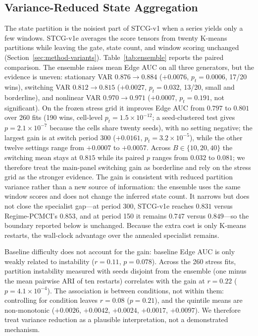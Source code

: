 \documentclass[sigconf,anonymous]{acmart}
\begin{document}
\subsection{Variance-Reduced State Aggregation}
\label{sec:exp-ensemble}

The state partition is the noisiest part of STCG-v1 when a series yields only a few windows.
STCG-v1e averages the score tensors from twenty K-means partitions while leaving the gate, state count, and window scoring unchanged (Section~\ref{sec:method-variants}).
Table~\ref{tab:ensemble} reports the paired comparison.
The ensemble raises mean Edge AUC on all three generators, but the evidence is uneven: stationary VAR $0.876\rightarrow0.884$ ($+0.0076$, $p_t=0.0006$, 17/20 wins), switching VAR $0.812\rightarrow0.815$ ($+0.0027$, $p_t=0.032$, 13/20, small and borderline), and nonlinear VAR $0.970\rightarrow0.971$ ($+0.0007$, $p_t=0.191$, not significant).
On the frozen stress grid it improves Edge AUC from $0.797$ to $0.801$ over 260 fits (190 wins, cell-level $p_t=1.5\times10^{-12}$; a seed-clustered test gives $p=2.1\times10^{-7}$ because the cells share twenty seeds), with no setting negative; the largest gain is at switch period 300 ($+0.0161$, $p_t=3.2\times10^{-5}$), while the other twelve settings range from $+0.0007$ to $+0.0057$.
Across $B\in\{10,20,40\}$ the switching mean stays at $0.815$ while its paired $p$ ranges from $0.032$ to $0.081$; we therefore treat the main-panel switching gain as borderline and rely on the stress grid as the stronger evidence.
The gain is consistent with reduced partition variance rather than a new source of information: the ensemble uses the same window scores and does not change the inferred state count.
It narrows but does not close the specialist gap---at period 300, STCG-v1e reaches $0.831$ versus Regime-PCMCI's $0.853$, and at period 150 it remains $0.747$ versus $0.849$---so the boundary reported below is unchanged.
Because the extra cost is only K-means restarts, the wall-clock advantage over the annealed specialist remains.

Baseline difficulty does not account for the gain: baseline Edge AUC is only weakly related to instability ($r=0.11$, $p=0.078$).
Across the 260 stress fits, partition instability measured with seeds disjoint from the ensemble (one minus the mean pairwise ARI of ten restarts) correlates with the gain at $r=0.22$ ($p=4.1\times10^{-4}$).
The association is between conditions, not within them: controlling for condition leaves $r=0.08$ ($p=0.21$), and the quintile means are non-monotonic ($+0.0026$, $+0.0042$, $+0.0024$, $+0.0017$, $+0.0097$).
We therefore treat variance reduction as a plausible interpretation, not a demonstrated mechanism.
\end{document}
